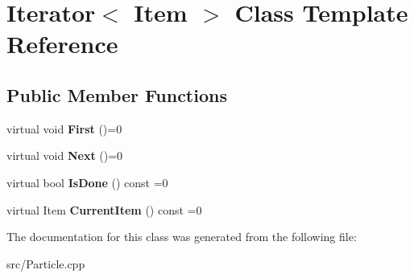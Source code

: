 \hypertarget{class_iterator}{}\section{Iterator$<$ Item $>$ Class Template Reference}
\label{class_iterator}
\subsection*{Public Member Functions}
\begin{DoxyCompactItemize}
\item 
\mbox{\label{class_iterator_ab50d3d7ae6eea85b3a0d5d772634e26b}} 
virtual void {\bfseries First} ()=0
\item 
\mbox{\label{class_iterator_abd77d09a88909400b65ab95a55a636cf}} 
virtual void {\bfseries Next} ()=0
\item 
\mbox{\label{class_iterator_ac4c54c80c84ac3c3dbd75942fcb81671}} 
virtual bool {\bfseries Is\+Done} () const =0
\item 
\mbox{\label{class_iterator_a1ae60208b26a4ae33f57181806816a33}} 
virtual Item {\bfseries Current\+Item} () const =0
\end{DoxyCompactItemize}


The documentation for this class was generated from the following file\+:\begin{DoxyCompactItemize}
\item 
src/Particle.\+cpp\end{DoxyCompactItemize}
